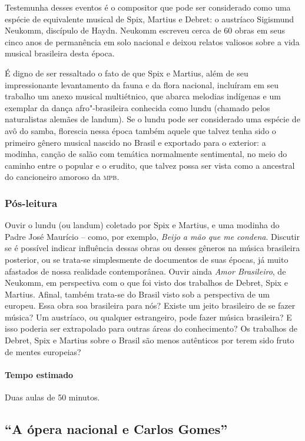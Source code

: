 \documentclass[11pt]{extarticle}
\begin{document}
Testemunha desses eventos é o compositor que pode ser considerado como uma
espécie de equivalente musical de Spix, Martius e Debret: o austríaco Sigismund
Neukomm, discípulo de Haydn. Neukomm escreveu cerca de 60 obras em seus cinco
anos de permanência em solo nacional e deixou relatos valiosos sobre a vida
musical brasileira desta época.

É digno de ser ressaltado o fato de que Spix e Martius, além de seu
impressionante levantamento da fauna e da flora nacional, incluíram em seu
trabalho um anexo musical multiétnico, que abarca melodias indígenas e um
exemplar da dança afro"-brasileira conhecida como lundu (chamado pelos
naturalistas alemães de landum). Se o lundu pode ser considerado uma espécie de
avô do samba, florescia nessa época também aquele que talvez tenha sido o
primeiro gênero musical nascido no Brasil e exportado para o exterior: a
modinha, canção de salão com temática normalmente sentimental, no meio do
caminho entre o popular e o erudito, que talvez possa ser vista como a
ancestral do cancioneiro amoroso da \textsc{mpb}.

\subsubsection{Pós-leitura}

Ouvir o lundu (ou landum) coletado por Spix e Martius, e uma modinha do Padre
José Maurício – como, por exemplo, \emph{Beijo a mão que me condena}. Discutir se é
possível indicar influência dessas obras ou desses gêneros na música brasileira
posterior, ou se trata-se simplesmente de documentos de suas épocas, já muito
afastados de nossa realidade contemporânea. Ouvir ainda \emph{Amor Brasileiro}, de
Neukomm, em perspectiva com o que foi visto dos trabalhos de Debret, Spix e
Martius. Afinal, também trata-se do Brasil visto sob a perspectiva de um
europeu. Essa obra soa brasileira para nós? Existe um jeito brasileiro de se
fazer música? Um austríaco, ou qualquer estrangeiro, pode fazer música
brasileira? E isso poderia ser extrapolado para outras áreas do conhecimento?
Os trabalhos de Debret, Spix e Martius sobre o Brasil são menos autênticos por
terem sido fruto de mentes europeias?

\paragraph{Tempo estimado} Duas aulas de 50 minutos. 

 
\subsection{“A ópera nacional e Carlos Gomes”}
\end{document}

